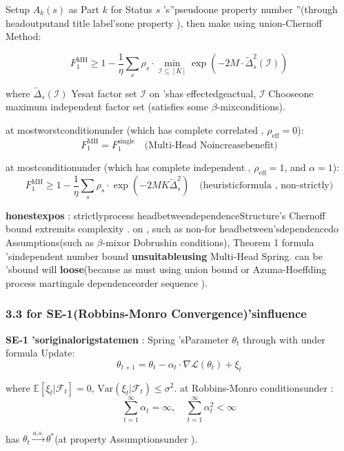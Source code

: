 \documentclass[
  12pt,
]{article}
\begin{document}
Setup \(A_k(s)\) as Part \(k\) for Status \(s\)
's''pseudoone property number ''(through headoutputand title label'sone property ), then make using 
union-Chernoff Method: 

\[\boxed{F_1^{\text{MH}} \geq 1 - \frac{1}{\eta} \sum_{s} \rho_s \cdot \min_{\mathcal{I} \subseteq [K]} \exp\left(-2M \cdot \tilde{\Delta}_s^2(\mathcal{I})\right)}\]

where \(\tilde{\Delta}_s(\mathcal{I})\) Yesat factor set  \(\mathcal{I}\)
on 'shas effectedgeactual, \(\mathcal{I}\) Chooseone maximum independent factor set (satisfies some
\(\beta\)-mixconditions). 

at mostworstconditionunder (which has complete correlated , \(\rho_{\text{eff}} = 0\)):
\[F_1^{\text{MH}} = F_1^{\text{single}} \quad \text{(Multi-Head Noincreasebenefit)}\]

at mostconditionunder (which has complete independent , \(\rho_{\text{eff}} = 1\), and 
\(\alpha = 1\)):
\[F_1^{\text{MH}} \geq 1 - \frac{1}{\eta} \sum_s \rho_s \cdot \exp\left(-2M K \tilde{\Delta}_s^2\right) \quad \text{(heuristicformula , non-strictly)}\]

\textbf{honestexpos }: strictlyprocess headbetweendependenceStructure's Chernoff bound
extremits complexity . on , such as non-for headbetween'sdependencedo Assumptions(such as  \(\beta\)-mixor 
Dobrushin conditions), Theorem 1 formula 'sindependent number bound \textbf{unsuitableusing } Multi-Head
Spring. can be 'sbound will \textbf{loose}(because as must using  union bound or 
Azuma-Hoeffding process  martingale dependenceorder sequence ). 

\subsubsection{3.3 for  SE-1(Robbins-Monro
Convergence)'sinfluence }\label{ux5bf9-se-1robbins-monro-ux6536ux655bux7684ux5f71ux54cd}

\textbf{SE-1 'soriginalorigstatemen }: Spring 'sParameter \(\theta_t\) through with under formula Update: 
\[\theta_{t+1} = \theta_t - \alpha_t \cdot \nabla \mathcal{L}(\theta_t) + \xi_t\]

where
\(\mathbb{E}[\xi_t | \mathcal{F}_t] = 0\), \(\text{Var}(\xi_t | \mathcal{F}_t) \leq \sigma^2\). at 
Robbins-Monro conditionsunder : 
\[\sum_{t=1}^{\infty} \alpha_t = \infty, \quad \sum_{t=1}^{\infty} \alpha_t^2 < \infty\]

has  \(\theta_t \xrightarrow{a.s.} \theta^*\)(at property Assumptionsunder ). 
\end{document}
